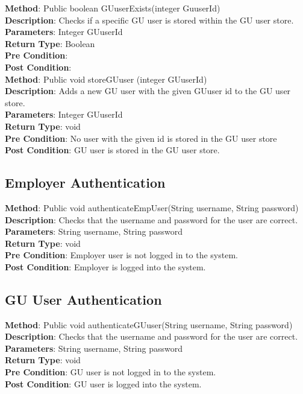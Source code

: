 \documentclass{l3deliverable}
\begin{document}
\textbf{Method}: Public boolean GUuserExists(integer GuuserId)\\
\textbf{Description}: Checks if a specific GU user is stored within the GU user store.\\
\textbf{Parameters}: Integer GUuserId\\
\textbf{Return Type}: Boolean\\
\textbf{Pre Condition}:\\
\textbf{Post Condition}:\\

\textbf{Method}: Public void storeGUuser (integer GUuserId)\\
\textbf{Description}: Adds a new GU user with the given GUuser id to the GU user store.\\
\textbf{Parameters}: Integer GUuserId\\
\textbf{Return Type}: void\\
\textbf{Pre Condition}: No user with the given id is stored in the GU user store\\
\textbf{Post Condition}: GU user is stored in the GU user store.\\

\subsection{Employer Authentication}

\textbf{Method}: Public void authenticateEmpUser(String username, String password)\\
\textbf{Description}: Checks that the username and password for the user are correct.\\
\textbf{Parameters}: String username, String password\\
\textbf{Return Type}: void\\
\textbf{Pre Condition}: Employer user is not logged in to the system.\\
\textbf{Post Condition}: Employer is logged into the system.\\

\subsection{GU User Authentication}

\textbf{Method}: Public void authenticateGUuser(String username, String password)\\
\textbf{Description}: Checks that the username and password for the user are correct. \\
\textbf{Parameters}: String username, String password\\
\textbf{Return Type}: void\\
\textbf{Pre Condition}: GU user is not logged in to the system.\\
\textbf{Post Condition}: GU user is logged into the system.\\
\end{document}
